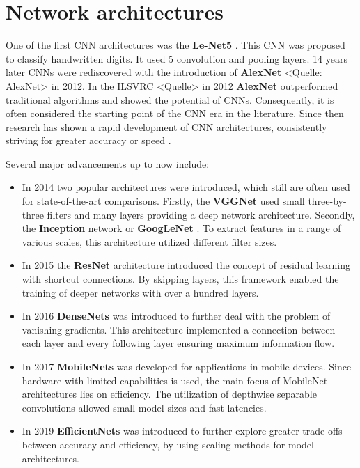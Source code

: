 \section{Network architectures}
\label{sec:networkArchitectures}

One of the first CNN architectures was the \textbf{Le-Net5} \cite{LeNet5}.
This CNN was proposed to classify handwritten digits.
It used 5 convolution and pooling layers.
14 years later CNNs were rediscovered with the introduction of \textbf{AlexNet} <Quelle: AlexNet> in 2012.
In the \ac{ILSVRC} <Quelle> in 2012 \textbf{AlexNet} outperformed traditional algorithms and showed the potential of CNNs.
Consequently, it is often considered the starting point of the CNN era in the literature.
Since then research has shown a rapid development of CNN architectures, consistently striving for greater accuracy or speed \cite{networkArchitectureSurvey}.

\vspace{1cm} %

\noindent Several major advancements up to now include:

\begin{itemize}
    \item In 2014 two popular architectures were introduced, which still are often used for state-of-the-art comparisons. Firstly, the \textbf{\ac{VGGNet}} \cite{VGGNet2015} used small three-by-three filters and many layers providing a deep network architecture. Secondly, the \textbf{Inception} network or \textbf{GoogLeNet} \cite{InceptionNet}. To extract features in a range of various scales, this architecture utilized different filter sizes.
    \item In 2015 the \textbf{ResNet} architecture \cite{ResNet} introduced the concept of residual learning with shortcut connections. By skipping layers, this framework enabled the training of deeper networks with over a hundred layers.
    \item In 2016 \textbf{DenseNets} \cite{DenseNets} was introduced to further deal with the problem of vanishing gradients. This architecture implemented a connection between each layer and every following layer ensuring maximum information flow.
    \item In 2017 \textbf{MobileNets} \cite{MobileNetV1} \cite{MobileNetV2} \cite{MobileNetV2Arxiv} \cite{MobileNetV3} was developed for applications in mobile devices. Since hardware with limited capabilities is used, the main focus of MobileNet architectures lies on efficiency. The utilization of depthwise separable convolutions allowed small model sizes and fast latencies.
    \item In 2019 \textbf{EfficientNets} \cite{EfficientNet} was introduced to further explore greater trade-offs between accuracy and efficiency, by using scaling methods for model architectures. 
\end{itemize}


